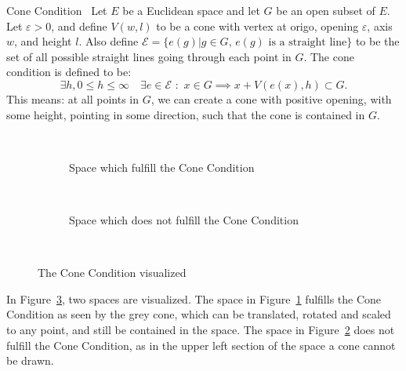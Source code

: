 \begin{defn}{Cone Condition}~\label{def:cone_condition}
    Let $E$ be a Euclidean space and let $G$ be an open subset of $E$.
    Let $\varepsilon >0$, and define 
    $V(w, l)$ to be a cone with vertex at origo, opening $\varepsilon$, axis $w$,
    and height $l$.
    Also define $\mathcal{E} = \{e(g) | g \in G, \, e(g) \text{ is a straight line}\}$ 
    to be the set of all possible straight lines going through each point in $G$. %
    The cone condition is defined to be:
    \begin{equation*}
        \exists h, 0\leq h \leq \infty \quad
        \exists e\in \mathcal{E} \,\, : \,\,  x \in G \implies 
        x + V(e(x), h) \subset G. %
    \end{equation*}
    This means: at all points in $G$, we can create a cone with positive opening,
    with some height, pointing in some direction, such that the cone is contained 
    in $G$.
\end{defn}
\begin{figure}[H]
    \centering
    \begin{subfigure}{.3\textwidth}
        \centering
        
        \caption{Space which fulfill the Cone Condition}~\label{fig:cone_condition_true}
      \end{subfigure}
    \begin{subfigure}{.3\textwidth}
        \centering
        
        \caption{Space which does not fulfill the Cone Condition}~\label{fig:cone_condition_false}
      \end{subfigure}
      \caption{The Cone Condition visualized}~\label{fig:cone_condition_visu}
\end{figure}
In Figure~\ref{fig:cone_condition_visu}, two spaces are visualized.
 The space in Figure~\ref{fig:cone_condition_true} fulfills the Cone Condition as seen 
 by the grey cone, which can be translated, rotated and scaled to any point, and still 
 be contained in the space. The space  
 in Figure~\ref{fig:cone_condition_false} does not fulfill the Cone Condition, as
in the upper left section of the space a cone cannot be drawn.

